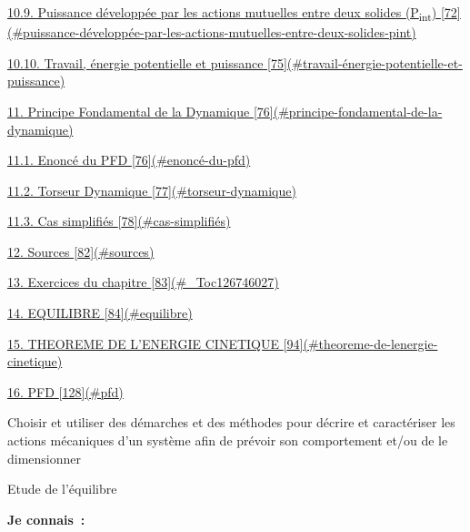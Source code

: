 \protect\hyperlink{puissance-duxe9veloppuxe9e-par-les-actions-mutuelles-entre-deux-solides-pint}{10.9. Puissance développée par les actions mutuelles entre deux solides (P\textsubscript{int}) {[}72{]}(\#puissance-développée-par-les-actions-mutuelles-entre-deux-solides-pint)}

\protect\hyperlink{travail-uxe9nergie-potentielle-et-puissance}{10.10. Travail, énergie potentielle et puissance {[}75{]}(\#travail-énergie-potentielle-et-puissance)}

\protect\hyperlink{principe-fondamental-de-la-dynamique}{11. Principe Fondamental de la Dynamique {[}76{]}(\#principe-fondamental-de-la-dynamique)}

\protect\hyperlink{enoncuxe9-du-pfd}{11.1. Enoncé du PFD {[}76{]}(\#enoncé-du-pfd)}

\protect\hyperlink{torseur-dynamique}{11.2. Torseur Dynamique {[}77{]}(\#torseur-dynamique)}

\protect\hyperlink{cas-simplifiuxe9s}{11.3. Cas simplifiés {[}78{]}(\#cas-simplifiés)}

\protect\hyperlink{sources}{12. Sources {[}82{]}(\#sources)}

\protect\hyperlink{_Toc126746027}{13. Exercices du chapitre {[}83{]}(\#\_Toc126746027)}

\protect\hyperlink{equilibre}{14. EQUILIBRE {[}84{]}(\#equilibre)}

\protect\hyperlink{theoreme-de-lenergie-cinetique}{15. THEOREME DE L'ENERGIE CINETIQUE {[}94{]}(\#theoreme-de-lenergie-cinetique)}

\protect\hyperlink{pfd}{16. PFD {[}128{]}(\#pfd)}

Choisir et utiliser des démarches et des méthodes pour décrire et caractériser les actions mécaniques d'un système afin de prévoir son comportement et/ou de le dimensionner

Etude de l'équilibre

\textbf{Je connais~:}

